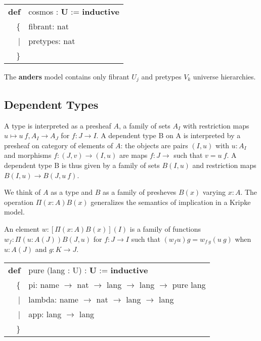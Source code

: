 \documentclass[a4paper,UKenglish,cleveref, autoref, thm-restate]{lipics-v2021}
\newcommand{\tabstyle}[0]{\scriptsize\ttfamily\fontseries{l}\selectfont}
\begin{document}
\begin{table}[ht]
\tabstyle
\begin{tabular}{rl}
     \textbf{def} & cosmos : \textbf{U} := \textbf{inductive} \\
               \{ & fibrant: nat \\
               |  & pretypes: nat \\
               \} & \\
\end{tabular}
\end{table}

The \textbf{anders} model contains only fibrant $U_j$ and pretypes $V_k$ universe hierarchies.

\newpage

\subsection{Dependent Types}

\begin{definition}[Type]
A type is interpreted as a presheaf $A$, a family of sets $A_I$ with restriction maps
$u \mapsto u\ f, A_I \rightarrow A_J$ for $f: J\rightarrow I$. A dependent type
B on A is interpreted by a presheaf on category of elements of $A$: the objects
are pairs $(I,u)$ with $u : A_I$ and morphisms $f: (J,v) \rightarrow (I,u)$ are
maps $f : J \rightarrow$ such that $v = u\ f$. A dependent type B is thus given
by a family of sets $B(I,u)$ and restriction maps $B(I,u) \rightarrow B(J,u\ f)$.
\end{definition}


We think of $A$ as a type and $B$ as a family of presheves $B(x)$ varying $x:A$.
The operation $\Pi(x:A)B(x)$ generalizes the semantics of
implication in a Kripke model.

\begin{definition}[Pi]
An element $w:[\Pi(x:A)B(x)](I)$ is a family of functions $w_f : \Pi(u:A(J))B(J,u)$
for $f : J \rightarrow I$ such that $(w_f u)g=w_{f\ g}(u\ g)$ when $u:A(J)$ and $g:K\rightarrow J$.
\end{definition}
\begin{table}[ht]
\tabstyle
\begin{tabular}{rl}
  \textbf{def} & pure (lang : U) : \textbf{U} := \textbf{inductive} \\
            \{ & pi: name $\rightarrow$ nat $\rightarrow$ lang $\rightarrow$ lang $\rightarrow$ pure lang \\
             | & lambda: name $\rightarrow$ nat $\rightarrow$ lang $\rightarrow$ lang \\
             | & app: lang $\rightarrow$ lang \\
            \} & \\
\end{tabular}
\end{table}
\end{document}
